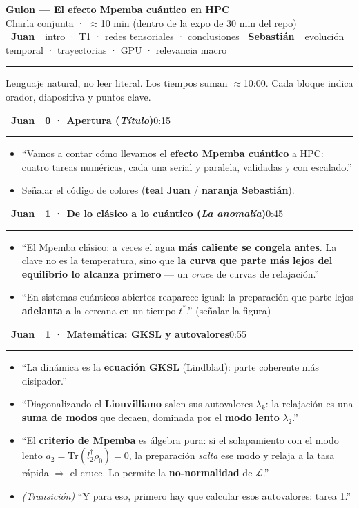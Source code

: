 \documentclass[11pt,a4paper]{article}
\newcommand{\Jb}{\colorbox{juan}{\color{white}\bfseries\footnotesize~Juan~}}
\newcommand{\Sb}{\colorbox{seb}{\color{white}\bfseries\footnotesize~Sebastián~}}
\newcommand{\cj}[1]{\textcolor{juan}{\textbf{#1}}}
\newcommand{\cs}[1]{\textcolor{seb}{\textbf{#1}}}
\newcommand{\blk}[3]{%
  \par\medskip\noindent #1\ \textbf{#2}\hfill\textcolor{soft}{\small #3}\par
  \vspace{-4pt}\textcolor{soft!40}{\rule{\linewidth}{0.4pt}}\par\vspace{-2pt}}
\begin{document}
\begin{center}
  {\LARGE\bfseries Guion --- El efecto Mpemba cuántico en HPC}\\[2pt]
  {\small\textcolor{soft}{Charla conjunta · $\approx$10 min (dentro de la expo de 30 min del repo)}}\\[6pt]
  {\footnotesize \Jb\ \textcolor{soft}{intro · T1 · redes tensoriales · conclusiones}\qquad
   \Sb\ \textcolor{soft}{evolución temporal · trayectorias · GPU · relevancia macro}}
\end{center}
\medskip
\hrule
\smallskip
{\footnotesize\textcolor{soft}{Lenguaje natural, no leer literal. Los tiempos suman $\approx$10:00. Cada bloque indica orador, diapositiva y puntos clave.}}

\blk{\Jb}{0 · Apertura (\emph{Título})}{0:15}
\begin{itemize}
  \item ``Vamos a contar cómo llevamos el \textbf{efecto Mpemba cuántico} a HPC:
    cuatro tareas numéricas, cada una serial y paralela, validadas y con escalado.''
  \item Señalar el código de colores (\cj{teal Juan} / \cs{naranja Sebastián}).
\end{itemize}

\blk{\Jb}{1 · De lo clásico a lo cuántico (\emph{La anomalía})}{0:45}
\begin{itemize}
  \item ``El Mpemba clásico: a veces el agua \textbf{más caliente se congela antes}.
    La clave no es la temperatura, sino que \textbf{la curva que parte más lejos del
    equilibrio lo alcanza primero} --- un \emph{cruce} de curvas de relajación.''
  \item ``En sistemas cuánticos abiertos reaparece igual: la preparación que parte
    lejos \textbf{adelanta} a la cercana en un tiempo $t^*$.'' (señalar la figura)
\end{itemize}

\blk{\Jb}{1 · Matemática: GKSL y autovalores}{0:55}
\begin{itemize}
  \item ``La dinámica es la \textbf{ecuación GKSL} (Lindblad): parte coherente más disipador.''
  \item ``Diagonalizando el \textbf{Liouvilliano} salen sus autovalores $\lambda_k$:
    la relajación es una \textbf{suma de modos} que decaen, dominada por el
    \textbf{modo lento} $\lambda_2$.''
  \item ``El \textbf{criterio de Mpemba} es álgebra pura: si el solapamiento con el
    modo lento $a_2=\mathrm{Tr}(l_2^\dagger\rho_0)=0$, la preparación \emph{salta} ese
    modo y relaja a la tasa rápida $\Rightarrow$ el cruce. Lo permite la
    \textbf{no-normalidad} de $\mathcal{L}$.''
  \item \emph{(Transición)} ``Y para eso, primero hay que calcular esos autovalores: tarea 1.''
\end{itemize}
\end{document}
